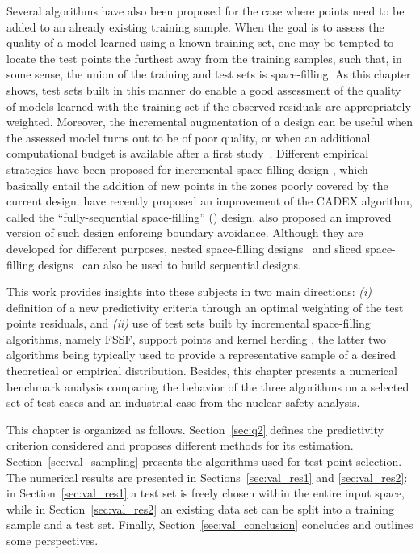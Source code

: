 Several algorithms have also been proposed for the case where points need to be added to an already existing training sample. 
When the goal is to assess the quality of a model learned using a known training set, one may be tempted to locate the test points the furthest away from the training samples, such that, in some sense, the union of the training and test sets is space-filling. 
As this chapter shows, test sets built in this manner do enable a good assessment of the quality of models learned with the training set if the observed residuals are appropriately weighted. 
Moreover, the incremental augmentation of a design can be useful when the assessed model turns out to be of poor quality, or when an additional computational budget is available after a first study~\citep{sheraz17,shang_apley_2020}. 
Different empirical strategies have been proposed for incremental space-filling design \citep{ioobou10,crolae11,lilu17}, which basically entail the addition of new points in the zones poorly covered by the current design. 
\citet{shang_apley_2020} have recently proposed an improvement of the CADEX algorithm, called the ``fully-sequential space-filling'' () design. 
\citet{NogalesPR2021} also proposed an improved version of such design enforcing boundary avoidance. 
Although they are developed for different purposes, nested space-filling designs~\citep{qiaai09} and sliced space-filling designs~\citep{qiawu09} can also be used to build sequential designs. 

This work provides insights into these subjects in two main directions: \textit{(i)} definition of a new predictivity criteria through an optimal weighting of the test points residuals, and \textit{(ii)} use of test sets built by incremental space-filling algorithms, namely FSSF, support points \citep{mak_joseph_2018} and kernel herding \citep{chen_welling_2010}, the latter two algorithms being typically used to provide a representative sample of a desired theoretical or empirical distribution. 
Besides, this chapter presents a numerical benchmark analysis comparing the behavior of the three algorithms on a selected set of test cases and an industrial case from the nuclear safety analysis.

This chapter is organized as follows. 
Section~\ref{sec:q2} defines the predictivity criterion considered and proposes different methods for its estimation. 
Section~\ref{sec:val_sampling} presents the algorithms used for test-point selection. 
The numerical results are presented in Sections~\ref{sec:val_res1} and \ref{sec:val_res2}: in Section~\ref{sec:val_res1} a test set is freely chosen within the entire input space, while in Section~\ref{sec:val_res2} an existing data set can be split into a training sample and a test set. 
Finally, Section~\ref{sec:val_conclusion} concludes and outlines some perspectives.




